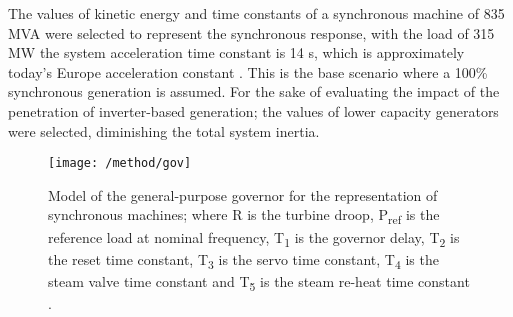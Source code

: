 The values of kinetic energy and time constants of a synchronous machine of 835 MVA were selected to represent the synchronous response, with the load of 315 MW the system acceleration time constant is 14 s, which is approximately today’s Europe acceleration constant \cite{ENTSOE.2016}. This is the base scenario where a 100\% synchronous generation is assumed. For the sake of evaluating the impact of the penetration of inverter-based generation; the values of lower capacity generators were selected, diminishing the total system inertia.\\
\begin{figure}[h]
	\centering
	\texttt{[image: /method/gov]}
	\caption{Model of the general-purpose governor for the representation of synchronous machines; where R is the turbine droop, P\textsubscript{ref} is the reference load at nominal frequency, T\textsubscript{1} is the governor delay, T\textsubscript{2} is the reset time constant, T\textsubscript{3} is the servo time constant, T\textsubscript{4} is the steam valve time constant and T\textsubscript{5} is the steam re-heat time constant \cite{Anderson.2002}.}
	\label{fig:gov}
\end{figure}

